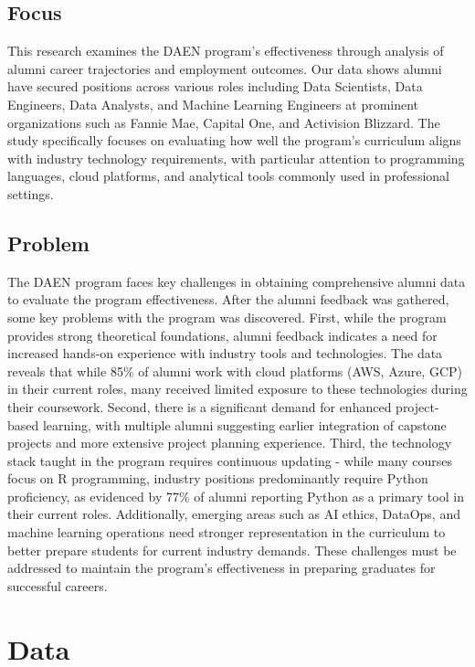 \documentclass[12pt,a4paper]{article}
\begin{document}
\subsection{Focus}
This research examines the DAEN program's effectiveness through analysis of alumni career trajectories and employment outcomes. Our data shows alumni have secured positions across various roles including Data Scientists, Data Engineers, Data Analysts, and Machine Learning Engineers at prominent organizations such as Fannie Mae, Capital One, and Activision Blizzard. The study specifically focuses on evaluating how well the program's curriculum aligns with industry technology requirements, with particular attention to programming languages, cloud platforms, and analytical tools commonly used in professional settings.

\subsection{Problem}
The DAEN program faces key challenges in obtaining comprehensive alumni data to evaluate the program effectiveness. After the alumni feedback was gathered, some key problems with the program was discovered. First, while the program provides strong theoretical foundations, alumni feedback indicates a need for increased hands-on experience with industry tools and technologies. The data reveals that while 85\% of alumni work with cloud platforms (AWS, Azure, GCP) in their current roles, many received limited exposure to these technologies during their coursework. Second, there is a significant demand for enhanced project-based learning, with multiple alumni suggesting earlier integration of capstone projects and more extensive project planning experience. Third, the technology stack taught in the program requires continuous updating - while many courses focus on R programming, industry positions predominantly require Python proficiency, as evidenced by 77\% of alumni reporting Python as a primary tool in their current roles. Additionally, emerging areas such as AI ethics, DataOps, and machine learning operations need stronger representation in the curriculum to better prepare students for current industry demands. These challenges must be addressed to maintain the program's effectiveness in preparing graduates for successful careers.

\section{Data}
\end{document}
